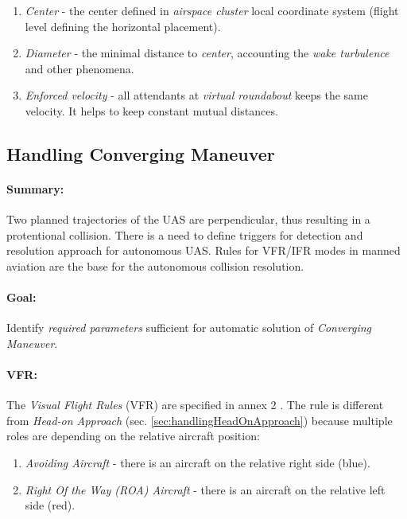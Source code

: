 \begin{enumerate}
    \item \emph{Center} - the center defined in \emph{airspace cluster} local coordinate system (flight level defining the horizontal placement).
    
    \item \emph{Diameter} - the minimal distance to \emph{center}, accounting the \emph{wake turbulence} and other phenomena. 
    
    \item \emph{Enforced velocity} - all attendants at \emph{virtual roundabout} keeps the same velocity. It helps to keep constant mutual distances.
\end{enumerate}



\subsection{Handling Converging Maneuver}\label{sec:handlingConvergingManuever}

\paragraph{Summary:} Two planned trajectories of the UAS are perpendicular, thus resulting in a protentional collision.  There is a need to define triggers for detection and resolution approach for autonomous UAS.  Rules for VFR/IFR modes in manned aviation are the base for the autonomous collision resolution.

\paragraph{Goal:} Identify \emph{required parameters} sufficient for automatic solution of \emph{Converging Maneuver}.

\paragraph{VFR:} The \emph{Visual Flight Rules} (VFR) are specified in annex 2 \cite{icaoAnnex2}. The rule is different from \emph{Head-on Approach} (sec. \ref{sec:handlingHeadOnApproach}) because multiple roles are depending on the relative aircraft position:
\begin{enumerate}
    \item \emph{Avoiding Aircraft} - there is an aircraft on the relative right side (blue). 
    \item \emph{Right Of the Way (ROA) Aircraft} - there is an aircraft on the relative left side (red). 
\end{enumerate}

